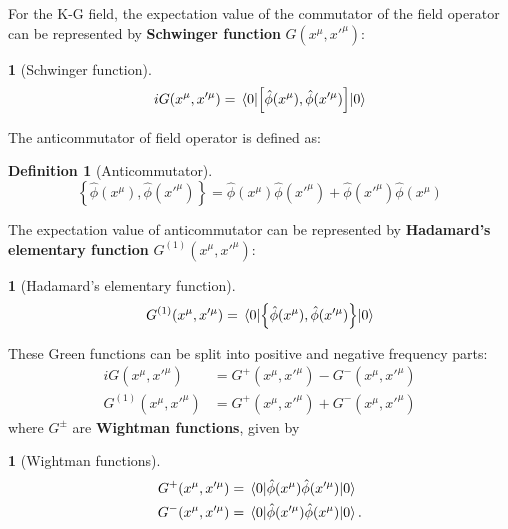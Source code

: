\documentclass[12pt]{article}
\numberwithin{equation}{section}
\theoremstyle{1style}
\newtheorem{definition}[equation]{Definition}
\newtheorem{cthm}[equation]{}
\newcommand{\tbf}[1]{\textbf{#1}}
\begin{document}
For the K-G field, the expectation value of the commutator of the field operator can be represented by \tbf{Schwinger function} \(G(x^{\mu},x'^{\mu})\):
\begin{cthm}[Schwinger function]
  \[iG(x^{\mu},x'^{\mu})=\expval{\left[\hat{\phi}(x^{\mu}),\hat{\phi}(x'^{\mu})\right]}{0}\]
\end{cthm}
The anticommutator of field operator is defined as:
\begin{definition}[Anticommutator]
  \[\left\{\hat{\phi}(x^{\mu}),\hat{\phi}(x'^{\mu})\right\}=\hat{\phi}(x^{\mu})\hat{\phi}(x'^{\mu})+\hat{\phi}(x'^{\mu})\hat{\phi}(x^{\mu})\]
\end{definition}
The expectation value of anticommutator can be represented by \tbf{Hadamard's elementary function} \(G^{(1)}(x^{\mu},x'^{\mu})\):
\begin{cthm}[Hadamard's elementary function]
  \[G^{(1)}(x^{\mu},x'^{\mu})=\expval{\left\{\hat{\phi}(x^{\mu}),\hat{\phi}(x'^{\mu})\right\}}{0}\]
\end{cthm}
These Green functions can be split into positive and negative frequency parts:
\begin{align}
  iG(x^{\mu},x'^{\mu})      & = G^+(x^{\mu},x'^{\mu})-G^-(x^{\mu},x'^{\mu}) \\
  G^{(1)}(x^{\mu},x'^{\mu}) & =G^+(x^{\mu},x'^{\mu})+G^-(x^{\mu},x'^{\mu})
\end{align}
where \(G^{\pm}\) are \tbf{Wightman functions}, given by
\begin{cthm}[Wightman functions]
  \begin{align*}
    G^+(x^{\mu},x'^{\mu}) & =\expval{\hat{\phi}(x^{\mu})\hat{\phi}(x'^{\mu})}{0}  \\
    G^-(x^{\mu},x'^{\mu}) & =\expval{\hat{\phi}(x'^{\mu})\hat{\phi}(x^{\mu})}{0}.
  \end{align*}
\end{cthm}
\end{document}
